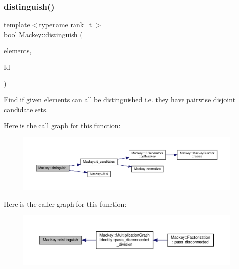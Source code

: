 \subsubsection{\texorpdfstring{distinguish()}{distinguish()}}
{\footnotesize\ttfamily template$<$typename rank\+\_\+t $>$ \\
bool Mackey\+::distinguish (\begin{DoxyParamCaption}\item[{const std\+::vector$<$ rank\+\_\+t $>$ \&}]{elements,  }\item[{const \hyperlink{classMackey_1_1IDGenerators}{I\+D\+Generators}$<$ rank\+\_\+t $>$ \&}]{Id }\end{DoxyParamCaption})}



Find if given elements can all be distinguished i.\+e. they have pairwise disjoint candidate sets. 

Here is the call graph for this function\+:\nopagebreak
\begin{figure}[H]
\begin{center}
\leavevmode
\includegraphics[width=350pt]{namespaceMackey_a281b9be315d7d51c7e691d4c733ac0c9_cgraph}
\end{center}
\end{figure}
Here is the caller graph for this function\+:\nopagebreak
\begin{figure}[H]
\begin{center}
\leavevmode
\includegraphics[width=350pt]{namespaceMackey_a281b9be315d7d51c7e691d4c733ac0c9_icgraph}
\end{center}
\end{figure}
\mbox{\label{namespaceMackey_a04fadcf186ab504cafeb259178ee4827}} 
